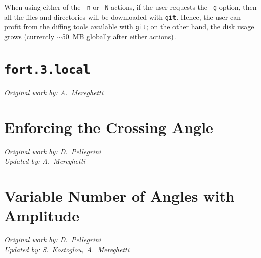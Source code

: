 When using either of the \texttt{-n} or \texttt{-N} actions,
if the user requests the \texttt{-g} option, then all the files
and directories will be downloaded with \texttt{git}. Hence, the
user can profit from the diffing tools available with \texttt{git};
on the other hand, the disk usage grows (currently $\sim$50~MB
globally after either actions).

\section{\texttt{fort.3.local}} \label{fort3local}
\begin{flushright}
\emph{Original work by: A.~Mereghetti}
\end{flushright}

\section{Enforcing the Crossing Angle} \label{EnforceXingAngle}
\begin{flushright}
\emph{Original work by: D.~Pellegrini} \\
\emph{Updated by: A.~Mereghetti}
\end{flushright}

\section{Variable Number of Angles with Amplitude} \label{varAnglesWithAmpli}
\begin{flushright}
\emph{Original work by: D.~Pellegrini} \\
\emph{Updated by: S.~Kostoglou, A.~Mereghetti}
\end{flushright}

